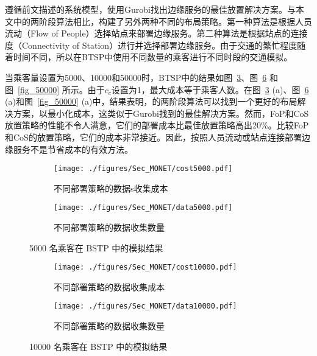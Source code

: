 遵循前文描述的系统模型，使用Gurobi找出边缘服务的最佳放置解决方案。与本文中的两阶段算法相比，构建了另外两种不同的布局策略。第一种算法是根据人员流动（Flow of People）选择站点来部署边缘服务。第二种算法是根据站点的连接度（Connectivity of Station）进行并选择部署边缘服务。由于交通的繁忙程度随着时间不同，所以在BTSP中使用不同数量的乘客进行不同时段的交通模拟。

当乘客量设置为5000、10000和50000时，BTSP中的结果如图~\ref{fig_5000}、图~\ref{fig_10000} 和图~\ref{fig_50000} 所示。由于$c_c$设置为1，最大成本等于乘客人数。在图~\ref{fig_5000} (a)、图~\ref{fig_10000} (a)和图~\ref{fig_50000} (a)中，结果表明，的两阶段算法可以找到一个更好的布局解决方案，以最小化成本，这类似于Gurobi找到的最佳解决方案。然而，FoP和CoS放置策略的性能不令人满意，它们的部署成本比最佳放置策略高出20\%。比较FoP和CoS的放置策略，它们的成本非常接近。因此，按照人员流动或站点连接部署边缘服务不是节省成本的有效方法。

\begin{figure}[!h]
  \centering
  \begin{subfigure}[b]{0.45\linewidth}
    \texttt{[image: ./figures/Sec\_MONET/cost5000.pdf]}
    \label{fig_cost5000}
    \vspace{-2em}
    \caption{不同部署策略的数据s收集成本}
  \end{subfigure}
  \begin{subfigure}[b]{0.45\linewidth}
    \texttt{[image: ./figures/Sec\_MONET/data5000.pdf]}
    \label{fig_data5000}
    \vspace{-2em}
    \caption{不同部署策略的数据收集数量}
  \end{subfigure}
    \vspace{-0.5em}
    \caption{5000 名乘客在 BSTP 中的模拟结果}
  \label{fig_5000}
\end{figure}

\begin{figure}[!h]
  \centering
  \begin{subfigure}[b]{0.45\linewidth}
    \texttt{[image: ./figures/Sec\_MONET/cost10000.pdf]}
    \label{fig_cost10000}
    \vspace{-2em}
    \caption{不同部署策略的数据收集成本}
  \end{subfigure}
  \begin{subfigure}[b]{0.45\linewidth}
    \texttt{[image: ./figures/Sec\_MONET/data10000.pdf]}
    \label{fig_data10000}
    \vspace{-2em}
    \caption{不同部署策略的数据收集数量}
  \end{subfigure}
    \vspace{-0.5em}
    \caption{10000 名乘客在 BSTP 中的模拟结果}
  \label{fig_10000}
\end{figure}

